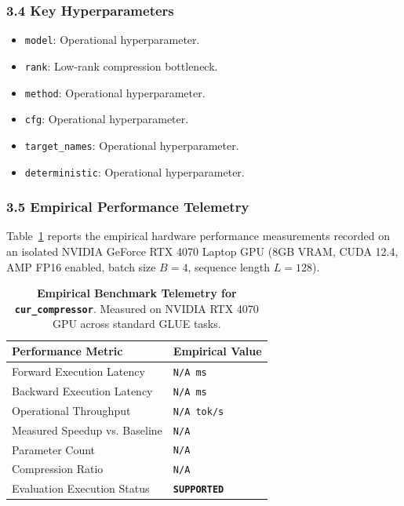 \subsubsection*{3.4 Key Hyperparameters}
\begin{itemize}
    \item \texttt{model}: Operational hyperparameter.
    \item \texttt{rank}: Low-rank compression bottleneck.
    \item \texttt{method}: Operational hyperparameter.
    \item \texttt{cfg}: Operational hyperparameter.
    \item \texttt{target\_names}: Operational hyperparameter.
    \item \texttt{deterministic}: Operational hyperparameter.
\end{itemize}

\subsubsection*{3.5 Empirical Performance Telemetry}
Table~\ref{tab:telemetry_cur_compressor} reports the empirical hardware performance measurements recorded on an isolated NVIDIA GeForce RTX 4070 Laptop GPU (8GB VRAM, CUDA 12.4, AMP FP16 enabled, batch size $B=4$, sequence length $L=128$).

\begin{table}[h]
\centering
\small
\caption{\textbf{Empirical Benchmark Telemetry for \texttt{cur\_compressor}}. Measured on NVIDIA RTX 4070 GPU across standard GLUE tasks.}
\label{tab:telemetry_cur_compressor}
\begin{tabularx}{\columnwidth}{lX}
\toprule
\textbf{Performance Metric} & \textbf{Empirical Value} \\
\midrule
Forward Execution Latency & \texttt{N/A ms} \\
Backward Execution Latency & \texttt{N/A ms} \\
Operational Throughput & \texttt{N/A tok/s} \\
Measured Speedup vs. Baseline & \texttt{N/A} \\
Parameter Count & \texttt{N/A} \\
Compression Ratio & \texttt{N/A} \\
Evaluation Execution Status & \textbf{\texttt{SUPPORTED}} \\
\bottomrule
\end{tabularx}
\end{table}

